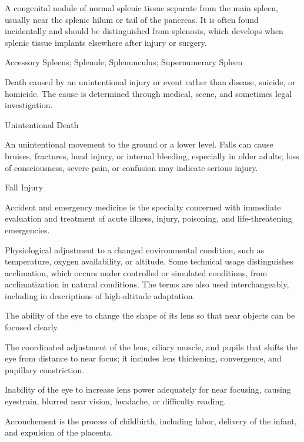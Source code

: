  A congenital nodule of normal splenic tissue separate from the main spleen, usually near the splenic hilum or tail of the pancreas. It is often found incidentally and should be distinguished from splenosis, which develops when splenic tissue implants elsewhere after injury or surgery.

\synonyms
Accessory Spleens; Splenule; Splenunculus; Supernumerary Spleen

 Death caused by an unintentional injury or event rather than disease, suicide, or homicide. The cause is determined through medical, scene, and sometimes legal investigation.

\synonyms
Unintentional Death

 An unintentional movement to the ground or a lower level. Falls can cause bruises, fractures, head injury, or internal bleeding, especially in older adults; loss of consciousness, severe pain, or confusion may indicate serious injury.

\synonyms
Fall Injury

 Accident and emergency medicine is the specialty concerned with immediate evaluation and treatment of acute illness, injury, poisoning, and life-threatening emergencies.

 Physiological adjustment to a changed environmental condition, such as temperature, oxygen
availability, or altitude. Some technical usage distinguishes acclimation, which occurs under controlled or simulated
conditions, from acclimatization in natural conditions. The terms are also used interchangeably, including in descriptions
of high-altitude adaptation.

 The ability of the eye to change the shape of its lens so that near objects can be focused clearly.

 The coordinated adjustment of the lens, ciliary muscle, and pupils that shifts the eye from distance to near focus; it includes lens thickening, convergence, and pupillary constriction.

 Inability of the eye to increase lens power adequately for near focusing, causing eyestrain, blurred near vision, headache, or difficulty reading.

 Accouchement is the process of childbirth, including labor, delivery of the infant, and expulsion of the placenta.

